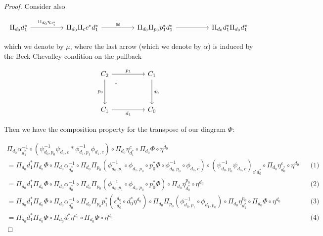 \documentclass[10pt, oneside]{article}
\begin{document}
\begin{proof}
Consider also

\[\begin{tikzcd}[ampersand replacement=\&]
	{\Pi_{d_0} d_1^\ast} \&\& {\Pi_{d_0} \Pi_{c} c^\ast d_1^\ast} \&\& {\Pi_{d_0} \Pi_{p_0} p_1^\ast d_1^\ast} \&\& {\Pi_{d_0} d_1^\ast \Pi_{d_0} d_1^\ast}
	\arrow["{\Pi_{d_0} \eta_{d_1^\ast}}", from=1-1, to=1-3]
	\arrow["\cong", from=1-3, to=1-5]
	\arrow[from=1-5, to=1-7]
\end{tikzcd}\]

\noindent which we denote by $\mu$, where the last arrow (which we denote by $\alpha$) is induced by the Beck-Chevalley condition on the pullback

\[\begin{tikzcd}[ampersand replacement=\&]
	{C_2} \&\& {C_1} \\
	\\
	{C_1} \&\& {C_0}
	\arrow["{p_1}", from=1-1, to=1-3]
	\arrow["{p_0}"', from=1-1, to=3-1]
	\arrow["{d_1}"', from=3-1, to=3-3]
	\arrow["{d_0}", from=1-3, to=3-3]
	\arrow["\lrcorner"{anchor=center, pos=0.125}, draw=none, from=1-1, to=3-3]
\end{tikzcd}\]

Then we have the composition property for the transpose of our diagram $\Phi$:

\begin{align*}
    \Pi_{d_0} \alpha^{-1}_{d_1^\ast} \circ (\psi_{d_0, p_0}^{-1} \psi_{d_0, c} \ast \phi_{d_1, p_1}^{-1} \phi_{d_1, c}) \circ \Pi_{d_0} \eta^c_{d_1^\ast} \circ \Pi_{d_0} \Phi \circ \eta^{d_0}
    \\ = \Pi_{d_0} d_1^\ast \Pi_{d_0} \Phi \circ \Pi_{d_0} \alpha^{-1}_{d_0^\ast} \circ \Pi_{d_0} \Pi_{p_0} \left(\phi_{d_0, p_1}^{-1} \circ \phi_{d_1, p_0} \circ p_0^\ast \Phi \circ \phi_{d_0, p_0}^{-1} \circ \phi_{d_0, c} \right) \circ (\psi_{d_0, p_0}^{-1} \psi_{d_0, c})_{c^\ast d_0^\ast} \circ \Pi_{d_0} \eta^c_{d_0^\ast} \circ \eta^{d_0} && \text{(1)}
    \\ = \Pi_{d_0} d_1^\ast \Pi_{d_0} \Phi \circ \Pi_{d_0} \alpha^{-1}_{d_0^\ast} \circ \Pi_{d_0} \Pi_{p_0} \left(\phi_{d_0, p_1}^{-1} \circ \phi_{d_1, p_0} \circ p_0^\ast \Phi \right) \circ \Pi_{d_0} \eta^{p_0}_{d_0^\ast} \circ \eta^{d_0} && \text{(2)}
    \\ = \Pi_{d_0} d_1^\ast \Pi_{d_0} \Phi \circ \Pi_{d_0} \alpha^{-1}_{d_0^\ast} \circ \Pi_{d_0} \Pi_{p_0} p_1^\ast (\epsilon^{d_0}_{d_0^\ast} \circ d_0^\ast \eta^{d_0}) \circ \Pi_{d_0} \Pi_{p_0} \left(\phi_{d_0, p_1}^{-1} \circ \phi_{d_1, p_0} \right) \circ \Pi_{d_0} \eta^{p_0}_{d_1^\ast} \circ \Pi_{d_0} \Phi \circ \eta^{d_0} && \text{(3)}
    \\ = \Pi_{d_0} d_1^\ast \Pi_{d_0} \Phi \circ \Pi_{d_0} d_1^\ast \eta^{d_0} \circ \Pi_{d_0} \Phi \circ \eta^{d_0} && \text{(4)}
\end{align*}


\end{proof}
\end{document}
